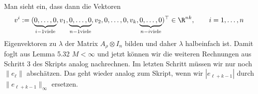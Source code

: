 \begin{solution}
Man sieht ein, dass dann die Vektoren
\begin{align*}
  v^i := (\underbrace{0,\dots,0}_{i -1 \text{viele}},v_1,\underbrace{0,\dots,0}_{n - 1 \text{viele}},
  v_2,0,\dots,0,v_k,\underbrace{0,\dots,0}_{n -i \text{viele}})^{\top} \in \R^{nk}, \qquad i = 1,\dots,n
\end{align*}
Eigenvektoren zu $\lambda$ der Matrix $A_{\rho} \otimes I_n$ bilden und daher
$\lambda$ halbeinfach ist. Damit foglt aus Lemma 5.32 $M < \infty$ und jetzt können
wir die weiteren Rechnungen aus Schritt 3 des Skripts analog nachrechnen.
Im letzten Schritt müssen wir nur noch $\|e_{\ell}\|$ abschätzen.
Das geht wieder analog zum Skript, wenn wir $|e_{\ell + k  - 1}|$
durch $\|e_{\ell + k  - 1}\|_{\infty}$ ersetzen.
\end{solution}

